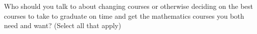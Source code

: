 \documentclass{ximera}
\begin{document}
\begin{problem}
    Who should you talk to about changing courses or otherwise deciding on the best courses to take to graduate on time and get the mathematics courses you both need and want? (Select all that apply)
    \begin{selectAll}
    \end{selectAll}
\end{problem}
\end{document}
